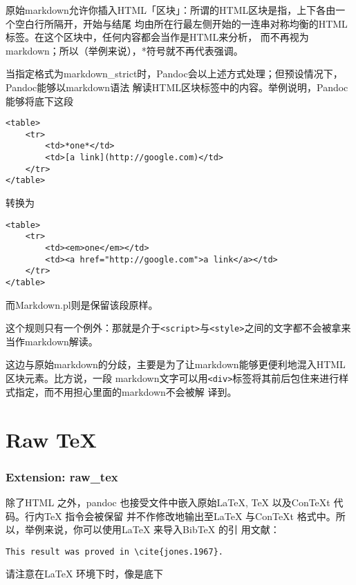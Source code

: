 \documentclass[cn]{elegantbook}
\newcommand{\passthrough}[1]{#1}
\begin{document}
原始markdown允许你插入HTML「区块」：所谓的HTML区块是指，上下各由一个空白行所隔开，开始与结尾
均由所在行最左侧开始的一连串对称均衡的HTML标签。在这个区块中，任何内容都会当作是HTML来分析，
而不再视为markdown；所以（举例来说），*符号就不再代表强调。

当指定格式为markdown\_strict时，Pandoc会以上述方式处理；但预设情况下，Pandoc能够以markdown语法
解读HTML区块标签中的内容。举例说明，Pandoc能够将底下这段

\begin{lstlisting}
<table>
    <tr>
        <td>*one*</td>
        <td>[a link](http://google.com)</td>
    </tr>
</table>
\end{lstlisting}

转换为

\begin{lstlisting}
<table>
    <tr>
        <td><em>one</em></td>
        <td><a href="http://google.com">a link</a></td>
    </tr>
</table>
\end{lstlisting}

而Markdown.pl则是保留该段原样。

这个规则只有一个例外：那就是介于\passthrough{\lstinline!<script>!}与\passthrough{\lstinline!<style>!}之间的文字都不会被拿来当作markdown解读。

这边与原始markdown的分歧，主要是为了让markdown能够更便利地混入HTML区块元素。比方说，一段
markdown文字可以用\passthrough{\lstinline!<div>!}标签将其前后包住来进行样式指定，而不用担心里面的markdown不会被解
译到。

\hypertarget{raw-tex}{%
\section{Raw TeX}\label{raw-tex}}

\hypertarget{extension-raw_tex}{%
\subsubsection{Extension: raw\_tex}\label{extension-raw_tex}}

除了HTML 之外，pandoc 也接受文件中嵌入原始LaTeX, TeX 以及ConTeXt
代码。行内TeX 指令会被保留 并不作修改地输出至LaTeX 与ConTeXt
格式中。所以，举例来说，你可以使用LaTeX 来导入BibTeX 的引 用文献：

\begin{lstlisting}
This result was proved in \cite{jones.1967}.
\end{lstlisting}

请注意在LaTeX 环境下时，像是底下
\end{document}
